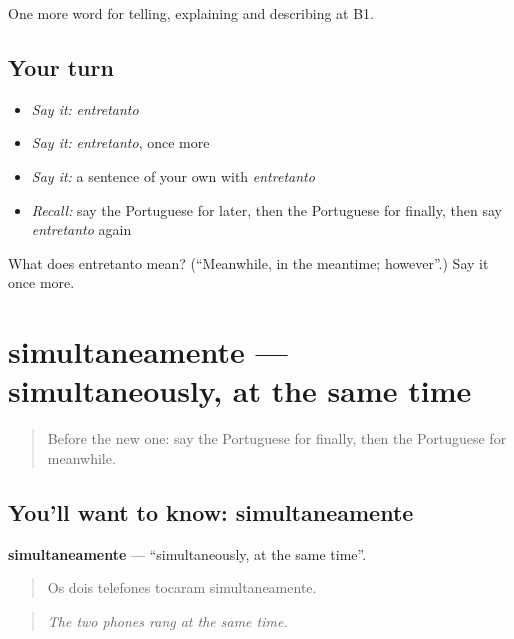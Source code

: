 \begin{grammarlens}[title={What you've built}]
One more word for telling, explaining and describing at B1.
\end{grammarlens}

\subsection*{Your turn}
\begin{itemize}
\raggedright
  \item \emph{Say it:} \emph{entretanto}
  \item \emph{Say it:} \emph{entretanto}, once more
  \item \emph{Say it:} a sentence of your own with \emph{entretanto}
  \item \emph{Recall:} say the Portuguese for later, then the Portuguese for finally, then say \emph{entretanto} again
\end{itemize}

\begin{tcolorbox}[breakable,colback=teal!4,colframe=teal!35!black,title={Before you move on}]
What does entretanto mean? (\textquotedblleft{}Meanwhile, in the meantime; however\textquotedblright{}.) Say it once more.
\end{tcolorbox}
\section[simultaneamente]{simultaneamente — simultaneously, at the same time}

\label{lesson:PT-C270-simultaneamente}



\begin{quote}
Before the new one: say the Portuguese for finally, then the Portuguese for meanwhile.
\end{quote}

\subsection*{You'll want to know: simultaneamente}
\textbf{simultaneamente} — \textquotedblleft{}simultaneously, at the same time\textquotedblright{}.

\begin{quote}
Os dois telefones tocaram simultaneamente.
\end{quote}

\begin{quote}
\emph{The two phones rang at the same time.}
\end{quote}

